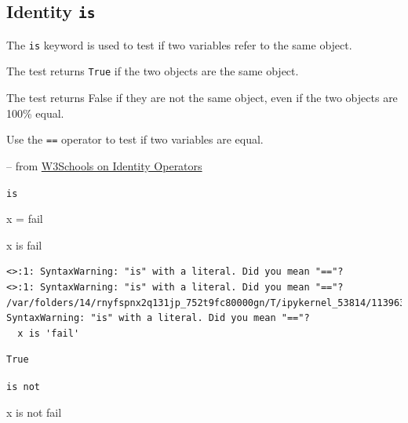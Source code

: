 \documentclass[
  letterpaper,
  DIV=11,
  numbers=noendperiod]{scrreprt}
\newenvironment{Shaded}{\begin{snugshade}}{\end{snugshade}}
\newcommand{\KeywordTok}[1]{\textcolor[rgb]{0.00,0.23,0.31}{#1}}
\newcommand{\NormalTok}[1]{\textcolor[rgb]{0.00,0.23,0.31}{#1}}
\newcommand{\OperatorTok}[1]{\textcolor[rgb]{0.37,0.37,0.37}{#1}}
\newcommand{\StringTok}[1]{\textcolor[rgb]{0.13,0.47,0.30}{#1}}
\begin{document}
\hypertarget{identity-is}{%
\subsection{\texorpdfstring{Identity
\texttt{is}}{Identity is}}\label{identity-is}}

The \texttt{is} keyword is used to test if two variables refer to the
same object.

The test returns \texttt{True} if the two objects are the same object.

The test returns False if they are not the same object, even if the two
objects are 100\% equal.

Use the \texttt{==} operator to test if two variables are equal.

-- from
\href{https://www.w3schools.com/python/gloss_python_identity_operators.asp}{W3Schools
on Identity Operators}

\texttt{is}

\begin{Shaded}
\begin{Highlighting}[]
\NormalTok{x }\OperatorTok{=} \StringTok{\textquotesingle{}fail\textquotesingle{}}
\end{Highlighting}
\end{Shaded}

\begin{Shaded}
\begin{Highlighting}[]
\NormalTok{x }\KeywordTok{is} \StringTok{\textquotesingle{}fail\textquotesingle{}}
\end{Highlighting}
\end{Shaded}

\begin{verbatim}
<>:1: SyntaxWarning: "is" with a literal. Did you mean "=="?
<>:1: SyntaxWarning: "is" with a literal. Did you mean "=="?
/var/folders/14/rnyfspnx2q131jp_752t9fc80000gn/T/ipykernel_53814/1139635342.py:1: SyntaxWarning: "is" with a literal. Did you mean "=="?
  x is 'fail'
\end{verbatim}

\begin{verbatim}
True
\end{verbatim}

\texttt{is\ not}

\begin{Shaded}
\begin{Highlighting}[]
\NormalTok{x }\KeywordTok{is} \KeywordTok{not} \StringTok{\textquotesingle{}fail\textquotesingle{}}
\end{Highlighting}
\end{Shaded}
\end{document}
